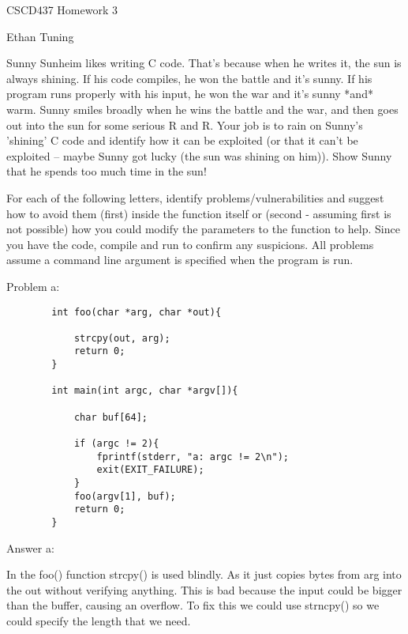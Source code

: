 \documentclass[11pt]{article}
\begin{document}
	
	\begin{center}
		{\LARGE CSCD437 Homework 3}
		
		\bigskip
		
		{\Large Ethan Tuning}
	\end{center}
	
	\bigskip
	
	
	Sunny Sunheim likes writing C code.  That's because when he writes it, the sun is always shining.  If his code compiles, he won the battle and it's sunny.  If his program runs properly with his input, he won the war and it's sunny *and* warm.  Sunny smiles broadly when he wins the battle and the war, and then goes out into the sun for some serious R and R.  Your job is to rain on Sunny's 'shining' C code and identify how it can be exploited (or that it can't be exploited -- maybe Sunny got lucky (the sun was shining on him)).  Show Sunny that he spends too much time in the sun!
	
	For each of the following letters, identify problems/vulnerabilities and suggest how to avoid them (first) inside the function itself or (second - assuming first is not possible) how you could modify the parameters to the function to help. Since you have the code, compile and run to confirm any suspicions. All problems assume a command line argument is specified when the program is run. 
	
	\bigskip

	Problem a:
	
	\bigskip
	 
	\begin{lstlisting}
		int foo(char *arg, char *out){
		
			strcpy(out, arg);
			return 0;
		}
		
		int main(int argc, char *argv[]){
		
			char buf[64];
		
			if (argc != 2){
				fprintf(stderr, "a: argc != 2\n");	
				exit(EXIT_FAILURE);
			}
			foo(argv[1], buf);
			return 0;
		}
	\end{lstlisting}
	
	\bigskip
	
	Answer a:

	\bigskip
	
	In the foo() function strcpy() is used blindly. As it just copies bytes from arg into the out without verifying anything. This is bad because the input could be bigger than the buffer, causing an overflow. To fix this we could use strncpy() so we could specify the length that we need.
	
\end{document}
